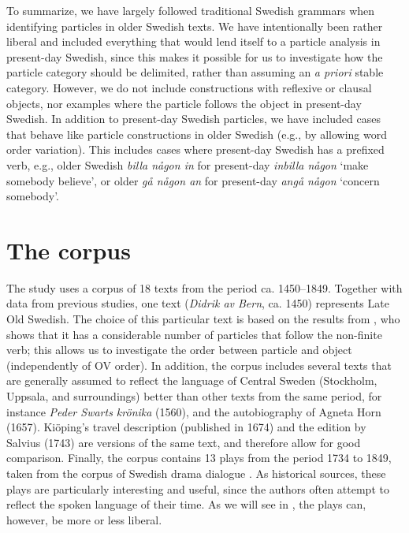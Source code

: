 \documentclass[output=paper]{langscibook}
\begin{document}
To summarize, we have largely followed traditional Swedish grammars when identifying particles in older Swedish texts. We have intentionally been rather liberal and included everything that would lend itself to a particle analysis in present-day Swedish, since this makes it possible for us to investigate how the particle category should be delimited, rather than assuming an \textit{a priori} stable category. However, we do not include constructions with reflexive or clausal objects, nor examples where the particle follows the object in present-day Swedish. In addition to present-day Swedish particles, we have included cases that behave like particle constructions in older Swedish (e.g., by allowing word order variation). This includes cases where present-day Swedish has a prefixed verb, e.g., older Swedish \textit{billa någon in} for present-day \textit{inbilla någon} ‘make somebody believe’, or older \textit{gå någon an} for present-day \textit{angå någon} ‘concern somebody’.


\section{The corpus}\label{sec:lalu:3}


The study uses a corpus of 18 texts from the period ca. 1450–1849. Together with data from previous studies, one text (\textit{Didrik av Bern}, ca. 1450) represents Late Old Swedish. The choice of this particular text is based on the results from \citet{Ljunggren1932}, who shows that it has a considerable number of particles that follow the non-finite verb; this allows us to investigate the order between particle and object (independently of OV order). In addition, the corpus includes several texts that are generally assumed to reflect the language of Central Sweden (Stockholm, Uppsala, and surroundings) better than other texts from the same period, for instance \textit{Peder Swarts krönika} (1560), and the autobiography of Agneta Horn (1657). Kiöping’s travel description (published in 1674) and the edition by Salvius (1743) are versions of the same text, and therefore allow for good comparison. Finally, the corpus contains 13 plays from the period 1734 to 1849, taken from the corpus of Swedish drama dialogue \citep{MarttalaStromquist2001}. As historical sources, these plays are particularly interesting and useful, since the authors often attempt to reflect the spoken language of their time. As we will see in , the plays can, however, be more or less liberal.
\end{document}
